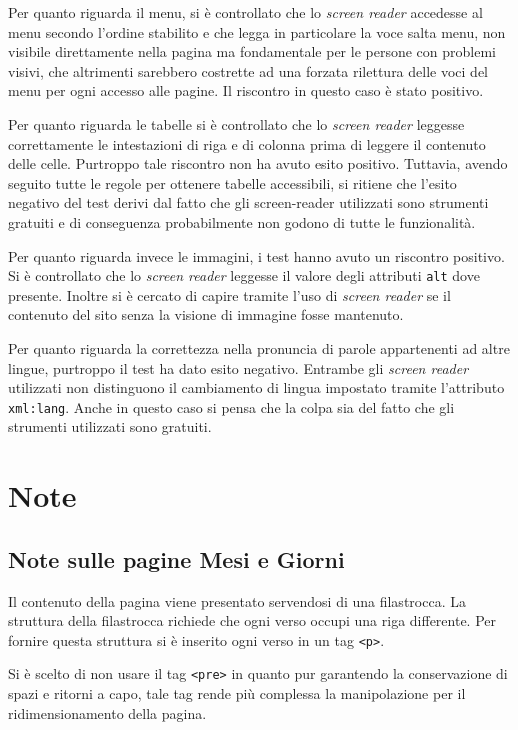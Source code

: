 \documentclass[10pt,a4paper,onecolumn]{article}
\newcommand{\inglese}[1]{\foreignlanguage{english}{\itshape{}#1}}
\begin{document}
Per quanto riguarda il menu, si è controllato che lo \inglese{screen reader} accedesse al menu secondo l'ordine stabilito e che legga in particolare la voce salta menu, non visibile direttamente nella pagina ma fondamentale per le persone con problemi visivi, che altrimenti sarebbero costrette ad una forzata rilettura delle voci del menu per ogni accesso alle pagine. Il riscontro in questo caso è stato positivo.

Per quanto riguarda le tabelle si è controllato che lo \inglese{screen reader} leggesse correttamente le intestazioni di riga e di colonna prima di leggere il contenuto delle celle. Purtroppo tale riscontro non ha avuto esito positivo. Tuttavia, avendo seguito tutte le regole per ottenere tabelle accessibili, si ritiene che l'esito negativo del test derivi dal fatto che gli screen-reader utilizzati sono strumenti gratuiti e di conseguenza probabilmente non godono di tutte le funzionalità.

Per quanto riguarda invece le immagini, i test hanno avuto un riscontro positivo. Si è controllato che lo \inglese{screen reader} leggesse il valore degli attributi \texttt{alt} dove presente. Inoltre si è cercato di capire tramite l'uso di \inglese{screen reader} se il contenuto del sito senza la visione di immagine fosse mantenuto.

Per quanto riguarda la correttezza nella pronuncia di parole appartenenti ad altre lingue, purtroppo il test ha dato esito negativo. Entrambe gli \inglese{screen reader} utilizzati non distinguono il cambiamento di lingua impostato tramite l'attributo  \texttt{xml:lang}.  Anche in questo caso si pensa che la colpa sia del fatto che gli strumenti utilizzati sono gratuiti.

\section{Note}
\subsection{Note sulle pagine Mesi e Giorni}
Il contenuto della pagina viene presentato servendosi di una filastrocca. La struttura della filastrocca richiede che ogni verso occupi una riga differente. Per fornire questa struttura si è inserito ogni verso in un tag \texttt{<p>}.

Si è scelto di non usare il tag \texttt{<pre>} in quanto pur garantendo la conservazione di spazi e ritorni a capo, tale tag rende più complessa la manipolazione per il ridimensionamento della pagina.
\end{document}
